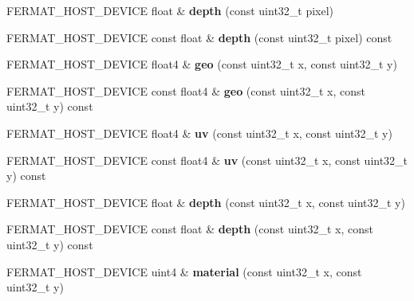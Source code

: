 \begin{DoxyCompactItemize}
F\+E\+R\+M\+A\+T\+\_\+\+H\+O\+S\+T\+\_\+\+D\+E\+V\+I\+CE float \& {\bfseries depth} (const uint32\+\_\+t pixel)
\item 
\mbox{\label{struct_g_buffer_view_afb94a09bc167671cbe1642b832966189}} 
F\+E\+R\+M\+A\+T\+\_\+\+H\+O\+S\+T\+\_\+\+D\+E\+V\+I\+CE const float \& {\bfseries depth} (const uint32\+\_\+t pixel) const
\item 
\mbox{\label{struct_g_buffer_view_ac27302954f61ba76fa75cc206196eea6}} 
F\+E\+R\+M\+A\+T\+\_\+\+H\+O\+S\+T\+\_\+\+D\+E\+V\+I\+CE float4 \& {\bfseries geo} (const uint32\+\_\+t x, const uint32\+\_\+t y)
\item 
\mbox{\label{struct_g_buffer_view_ab4b5852f933bb99f598ad1887a70de84}} 
F\+E\+R\+M\+A\+T\+\_\+\+H\+O\+S\+T\+\_\+\+D\+E\+V\+I\+CE const float4 \& {\bfseries geo} (const uint32\+\_\+t x, const uint32\+\_\+t y) const
\item 
\mbox{\label{struct_g_buffer_view_a7572f300ce312b075d00b2424c0a5b78}} 
F\+E\+R\+M\+A\+T\+\_\+\+H\+O\+S\+T\+\_\+\+D\+E\+V\+I\+CE float4 \& {\bfseries uv} (const uint32\+\_\+t x, const uint32\+\_\+t y)
\item 
\mbox{\label{struct_g_buffer_view_a1d82fdaf0e3eb07bc395a388315242d1}} 
F\+E\+R\+M\+A\+T\+\_\+\+H\+O\+S\+T\+\_\+\+D\+E\+V\+I\+CE const float4 \& {\bfseries uv} (const uint32\+\_\+t x, const uint32\+\_\+t y) const
\item 
\mbox{\label{struct_g_buffer_view_abe579abc46147dcdd5db4285a0e8a588}} 
F\+E\+R\+M\+A\+T\+\_\+\+H\+O\+S\+T\+\_\+\+D\+E\+V\+I\+CE float \& {\bfseries depth} (const uint32\+\_\+t x, const uint32\+\_\+t y)
\item 
\mbox{\label{struct_g_buffer_view_a133dbb23782a5b8fafc5937190d33e40}} 
F\+E\+R\+M\+A\+T\+\_\+\+H\+O\+S\+T\+\_\+\+D\+E\+V\+I\+CE const float \& {\bfseries depth} (const uint32\+\_\+t x, const uint32\+\_\+t y) const
\item 
\mbox{\label{struct_g_buffer_view_ab747d4a543c866f8bb5ee71046a02978}} 
F\+E\+R\+M\+A\+T\+\_\+\+H\+O\+S\+T\+\_\+\+D\+E\+V\+I\+CE uint4 \& {\bfseries material} (const uint32\+\_\+t x, const uint32\+\_\+t y)

\end{DoxyCompactItemize}
